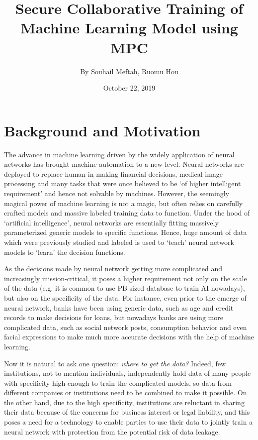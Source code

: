 \documentclass[a4paper,12pt]{article}
\begin{document}
\title{\Large{\textbf{Secure Collaborative Training of Machine Learning Model using MPC}}}
\author{By Souhail Meftah, Ruomu Hou}
\date{October 22, 2019}
\maketitle
\let\cleardoublepage\clearpage
\setcounter{page}{1}
\fancyhf{}



\section{Background and Motivation}
The advance in machine learning driven by the widely application of neural networks has brought machine automation to a new level. Neural networks are deployed to replace human in making financial decisions, medical image processing and many tasks that were once believed to be `of higher intelligent requirement' and hence not solvable by machines. However, the seemingly magical power of machine learning is not a magic, but often relies on carefully crafted models and massive labeled training data to function. Under the hood of `artificial intelligence', neural networks are essentially fitting massively parameterized generic models to specific functions. Hence, huge amount of data which were previously studied and labeled is used to `teach' neural network models to `learn' the decision functions.

As the decisions made by neural network getting more complicated and increasingly mission-critical, it poses a higher requirement not only on the scale of the data (e.g. it is common to use PB sized database to train AI nowadays), but also on the specificity of the data. For instance, even prior to the emerge of neural network, banks have been using generic data, such as age and credit records to make decisions for loans, but nowadays banks are using more complicated data, such as social network posts, consumption behavior and even facial expressions to make much more accurate decisions with the help of machine learning. 

Now it is natural to ask one question: \textit{where to get the data?} Indeed, few institutions, not to mention individuals, independently hold data of many people with specificity high enough to train the complicated models, so data from different companies or institutions need to be combined to make it possible. On the other hand, due to the high specificity, institutions are reluctant in sharing their data because of the concerns for business interest or legal liability, and this poses a need for a technology to enable parties to use their data to jointly train a neural network with protection from the potential risk of data leakage.
\end{document}
